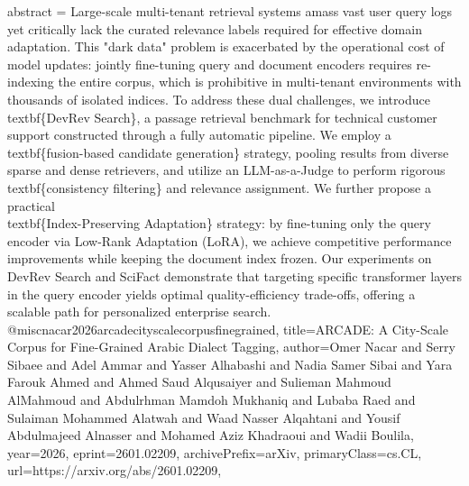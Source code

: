 {      abstract = {Large-scale multi-tenant retrieval systems amass vast user query logs yet critically lack the curated relevance labels required for effective domain adaptation. This "dark data" problem is exacerbated by the operational cost of model updates: jointly fine-tuning query and document encoders requires re-indexing the entire corpus, which is prohibitive in multi-tenant environments with thousands of isolated indices. To address these dual challenges, we introduce \\textbf\{DevRev Search\}, a passage retrieval benchmark for technical customer support constructed through a fully automatic pipeline. We employ a \\textbf\{fusion-based candidate generation\} strategy, pooling results from diverse sparse and dense retrievers, and utilize an LLM-as-a-Judge to perform rigorous \\textbf\{consistency filtering\} and relevance assignment. We further propose a practical \\textbf\{Index-Preserving Adaptation\} strategy: by fine-tuning only the query encoder via Low-Rank Adaptation (LoRA), we achieve competitive performance improvements while keeping the document index frozen. Our experiments on DevRev Search and SciFact demonstrate that targeting specific transformer layers in the query encoder yields optimal quality-efficiency trade-offs, offering a scalable path for personalized enterprise search.}
}@misc{nacar2026arcadecityscalecorpusfinegrained,
      title={ARCADE: A City-Scale Corpus for Fine-Grained Arabic Dialect Tagging}, 
      author={Omer Nacar and Serry Sibaee and Adel Ammar and Yasser Alhabashi and Nadia Samer Sibai and Yara Farouk Ahmed and Ahmed Saud Alqusaiyer and Sulieman Mahmoud AlMahmoud and Abdulrhman Mamdoh Mukhaniq and Lubaba Raed and Sulaiman Mohammed Alatwah and Waad Nasser Alqahtani and Yousif Abdulmajeed Alnasser and Mohamed Aziz Khadraoui and Wadii Boulila},
      year={2026},
      eprint={2601.02209},
      archivePrefix={arXiv},
      primaryClass={cs.CL},
      url={https://arxiv.org/abs/2601.02209},
}
